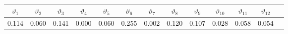 \begin{tabular}{ccccccccccccc}
\hline
\hline
\textbf{$\vartheta_1$} & \textbf{$\vartheta_2$} & \textbf{$\vartheta_3$} & \textbf{$\vartheta_4$} & \textbf{$\vartheta_5$} & \textbf{$\vartheta_6$} & \textbf{$\vartheta_7$} & \textbf{$\vartheta_8$} & \textbf{$\vartheta_9$} & \textbf{$\vartheta_{10}$} & \textbf{$\vartheta_{11}$} & \textbf{$\vartheta_{12}$} \\
\hline
0.114 & 0.060 & 0.141 & 0.000 & 0.060 & 0.255 & 0.002 & 0.120 & 0.107 & 0.028 & 0.058 & 0.054 \\
\hline
\end{tabular}